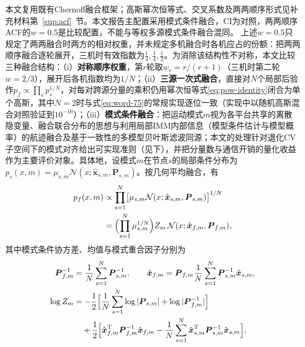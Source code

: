 \documentclass[UTF8,a4paper,zihao=-4]{ctexart}
\begin{document}
本文复用既有Chernoff融合框架\cite{ren2026,zhu2016,gunay2015,gunay2016}；高斯幂次恒等式、交叉系数及两两顺序形式见补充材料第~\ref{sup:acf}~节。本文报告主配置采用模式条件融合，CI为对照，两两顺序ACF的\(w=0.5\)是比较配置，不能与等权多源模式条件融合混同。
上述\(w=0.5\)只规定了两两融合时两方的相对权重，并未规定多机融合时各机应占的份额：把两两顺序融合逐轮展开，三机时有效指数为\(\tfrac14,\tfrac14,\tfrac12\)。为消除该结构性不对称，本文比较三种融合结构：（i）\textbf{对称顺序权重}，第\(r\)轮取\(w_r=r/(r+1)\)（三机时第二轮\(w=2/3\)），展开后各机指数均为\(1/N\)；（ii）\textbf{三源一次式融合}，直接对\(N\)个局部后验作\(p_f\propto\prod_s p_s^{1/N}\)，对每对跨源分量的乘积仍用幂次恒等式\eqref{eq:pow-identity}闭合为单个高斯，其中\(N=2\)时与式\eqref{eq:word-75}的常规实现逐位一致（实现中以随机高斯混合对照验证到\(10^{-16}\)）；（iii）\textbf{模式条件融合}：把运动模式\(m\)视为各平台共享的离散隐变量、融合联合分布的思想与利用局部IMM内部信息（模型条件估计与模型概率）的航迹融合\cite{visina2020}及基于一致性的多模型贝叶斯滤波\cite{battistelli2015}同源；本文的处理针对退化CV子空间下的模式对齐给出可实现准则（见下），并把分量数与通信开销的量化收益作为主要评价对象。具体地，设模式\(m\)在节点\(s\)的局部条件分布为\(p_s(x,m)=\mu_{s,m}\mathcal N(x;\hat{\boldsymbol x}_{s,m},\boldsymbol P_{s,m})\)。按几何平均融合，有
\begin{equation}
\begin{aligned}
p_f(x,m)&\propto\prod_{s=1}^{N}\bigl[\mu_{s,m}\mathcal N(x;\hat{\boldsymbol x}_{s,m},\boldsymbol P_{s,m})\bigr]^{1/N}\\
&=\Bigl(\prod_{s=1}^{N}\mu_{s,m}^{1/N}\Bigr)Z_m\,\mathcal N(x;\hat{\boldsymbol x}_{f,m},\boldsymbol P_{f,m}),
\end{aligned}
\label{eq:mode-cond}
\end{equation}
其中模式条件协方差、均值与模式重合因子分别为
\begin{equation}
\begin{aligned}
\boldsymbol P_{f,m}^{-1}&=\frac1N\sum_{s=1}^{N}\boldsymbol P_{s,m}^{-1},\qquad
\hat{\boldsymbol x}_{f,m}=\boldsymbol P_{f,m}\frac1N\sum_{s=1}^{N}\boldsymbol P_{s,m}^{-1}\hat{\boldsymbol x}_{s,m},\\
\log Z_m&=-\frac12\Bigl[\frac1N\sum_{s=1}^{N}\log|\boldsymbol P_{s,m}|+\log|\boldsymbol P_{f,m}^{-1}|\Bigr]\\
&\quad+\frac12\Bigl[\hat{\boldsymbol x}_{f,m}^{\mathrm T}\boldsymbol P_{f,m}^{-1}\hat{\boldsymbol x}_{f,m}
-\frac1N\sum_{s=1}^{N}\hat{\boldsymbol x}_{s,m}^{\mathrm T}\boldsymbol P_{s,m}^{-1}\hat{\boldsymbol x}_{s,m}\Bigr],
\end{aligned}
\label{eq:mode-cond-params}
\end{equation}
\end{document}
